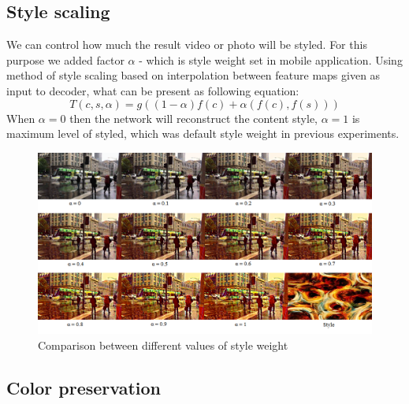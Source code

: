 \documentclass[../Main.tex]{subfiles}
\begin{document}
\subsection{Style scaling}
We can control how much the result video or photo will be styled. For this purpose we added factor $\alpha$ -  which is style weight set in mobile application. Using method of style scaling based on interpolation between feature maps given as input to decoder, what can be present as following equation: $$T(c,s,\alpha) = g((1-\alpha)f(c)+\alpha (f(c),f(s)))$$ When $\alpha= 0$  then the network will reconstruct the content style, $\alpha = 1$ is maximum level of styled, which was default style weight in previous experiments. 

\begin{figure}[h!]
    \centering
    \includegraphics[scale=0.75]{Images/style1.png}
    \caption{Comparison between different values of style weight}
    \label{fig:style1}
\end{figure}

\subsection{Color preservation}
\end{document}

